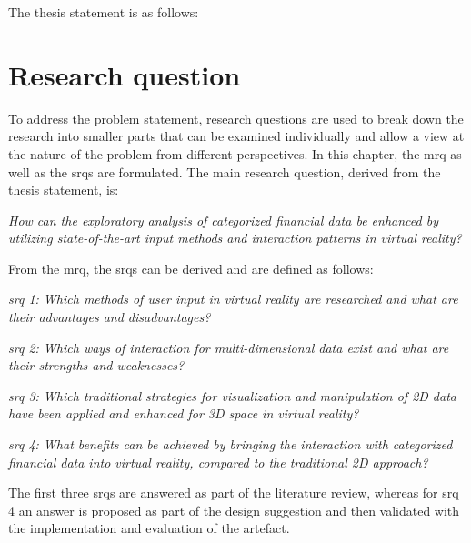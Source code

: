 The thesis statement is as follows:
\begin{framed}
	\textit{\thesisstatementtext}
\end{framed}


\section{Research question}

\newcommand{\mrqtext}{How can the exploratory analysis of categorized financial data be enhanced by utilizing state-of-the-art input methods and interaction patterns in virtual reality?}

\newcommand{\srqonetext}{Which methods of user input in virtual reality are researched and what are their advantages and disadvantages?}
\newcommand{\srqtwotext}{Which ways of interaction for multi-dimensional data exist and what are their strengths and weaknesses?}
\newcommand{\srqthreetext}{Which traditional strategies for visualization and manipulation of 2D data have been applied and enhanced for 3D space in virtual reality?}
\newcommand{\srqfourtext}{What benefits can be achieved by bringing the interaction with categorized financial data into virtual reality, compared to the traditional 2D approach?}

To address the problem statement, research questions are used to break down the research into smaller parts that can be examined individually and allow a view at the nature of the problem from different perspectives. In this chapter, the \gls{mrq} as well as the \glspl{srq} are formulated. \newline
The main research question, derived from the thesis statement, is:
\begin{framed}
	\textit{\mrqtext}
\end{framed} \label{MRQ}
From the \gls{mrq}, the \glspl{srq} can be derived and are defined as follows:
\begin{framed}
	\textit{\gls{srq} 1: \srqonetext}
\end{framed} \label{SRQ1}
\begin{framed}
	\textit{\gls{srq} 2: \srqtwotext}
\end{framed} \label{SRQ2}
\begin{framed}
	\textit{\gls{srq} 3: \srqthreetext}
\end{framed} \label{SRQ3}
 \begin{framed}
 	\textit{\gls{srq} 4: \srqfourtext}
 \end{framed} \label{SRQ4}
The first three \glspl{srq} are answered as part of the literature review, whereas for \gls{srq} 4 an answer is proposed as part of the design suggestion and then validated with the implementation and evaluation of the artefact.


